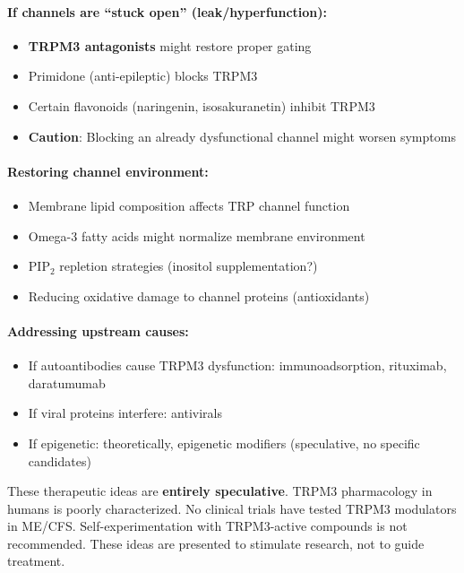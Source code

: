\paragraph{If channels are ``stuck open'' (leak/hyperfunction):}
\begin{itemize}
    \item \textbf{TRPM3 antagonists} might restore proper gating
    \item Primidone (anti-epileptic) blocks TRPM3
    \item Certain flavonoids (naringenin, isosakuranetin) inhibit TRPM3
    \item \textbf{Caution}: Blocking an already dysfunctional channel might worsen symptoms
\end{itemize}

\paragraph{Restoring channel environment:}
\begin{itemize}
    \item Membrane lipid composition affects TRP channel function
    \item Omega-3 fatty acids might normalize membrane environment
    \item PIP$_2$ repletion strategies (inositol supplementation?)
    \item Reducing oxidative damage to channel proteins (antioxidants)
\end{itemize}

\paragraph{Addressing upstream causes:}
\begin{itemize}
    \item If autoantibodies cause TRPM3 dysfunction: immunoadsorption, rituximab, daratumumab
    \item If viral proteins interfere: antivirals
    \item If epigenetic: theoretically, epigenetic modifiers (speculative, no specific candidates)
\end{itemize}

\begin{warning}
These therapeutic ideas are \textbf{entirely speculative}. TRPM3 pharmacology in humans is poorly characterized. No clinical trials have tested TRPM3 modulators in ME/CFS. Self-experimentation with TRPM3-active compounds is not recommended. These ideas are presented to stimulate research, not to guide treatment.
\end{warning}

